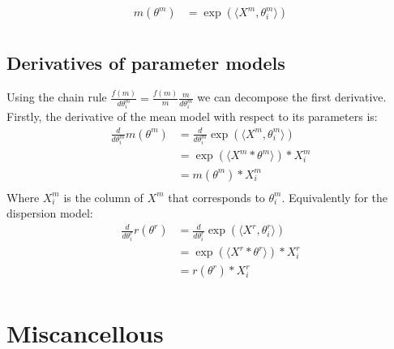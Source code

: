 \documentclass[bibliography=totoc,10pt]{scrartcl}
\begin{document}
\begin{equation}
\begin{split}
m(\theta^m) &= \exp(\langle X^m, \theta^m_i \rangle) \\
\end{split}
\end{equation}

\subsection{Derivatives of parameter models}
Using the chain rule $\frac{f(m)}{d \theta^m_i}=\frac{f(m)}{m}\frac{m}{d \theta^m_i}$ we can decompose the first derivative. Firstly, the derivative of the mean model with respect to its parameters is:
\begin{equation}
\begin{split}
\frac{d}{d \theta^m_i} m(\theta^m) &= \frac{d}{d \theta^m_i} \exp(\langle X^m, \theta^m_i \rangle) \\
&= \exp(\langle X^m * \theta^m \rangle) * X^m_{i}  \\
&= m(\theta^m) * X^m_{i}  \\
\end{split}
\end{equation}
Where $X^m_{i}$ is the column of $X^m$ that corresponds to $\theta^m_i$. Equivalently for the dispersion model: 
\begin{equation}
\begin{split}
\frac{d}{d \theta^r_i} r( \theta^r) &= \frac{d}{d \theta^r_i} \exp(\langle X^r, \theta^r_i \rangle) \\
&= \exp(\langle X^r * \theta^r \rangle) * X^r_{i}  \\
&= r(\theta^r) * X^r_{i}  \\
\end{split}
\end{equation}

\section{Miscancellous}
\end{document}

